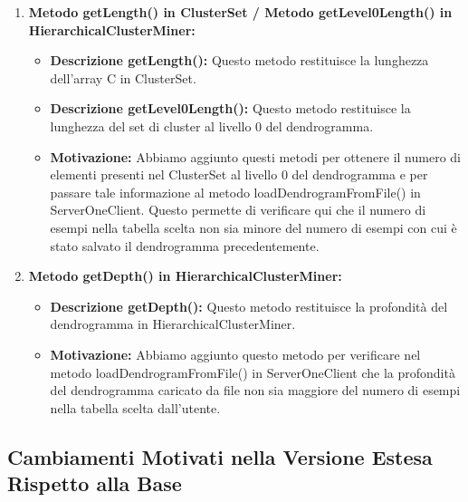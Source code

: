 \begin{enumerate}
    \item \textbf{Metodo getLength() in ClusterSet / Metodo getLevel0Length() in HierarchicalClusterMiner:}
    \begin{itemize}
        \item \textbf{Descrizione getLength():} Questo metodo restituisce la lunghezza dell'array C in ClusterSet.
        \item \textbf{Descrizione getLevel0Length():} Questo metodo restituisce la lunghezza del set di cluster al livello 0 del dendrogramma.
        \item \textbf{Motivazione:} Abbiamo aggiunto questi metodi per ottenere il numero di elementi presenti nel ClusterSet al livello 0 del dendrogramma e per passare tale informazione al metodo loadDendrogramFromFile() in ServerOneClient. Questo permette di verificare qui che il numero di esempi nella tabella scelta non sia minore del numero di esempi con cui è stato salvato il dendrogramma precedentemente.
    \end{itemize}
    
    \item \textbf{Metodo getDepth() in HierarchicalClusterMiner:}
    \begin{itemize}
        \item \textbf{Descrizione getDepth():} Questo metodo restituisce la profondità del dendrogramma in HierarchicalClusterMiner.
        \item \textbf{Motivazione:} Abbiamo aggiunto questo metodo per verificare nel metodo loadDendrogramFromFile() in ServerOneClient che la profondità del dendrogramma caricato da file non sia maggiore del numero di esempi nella tabella scelta dall'utente.
    \end{itemize}
\end{enumerate}

\subsection{Cambiamenti Motivati nella Versione Estesa Rispetto alla Base}

